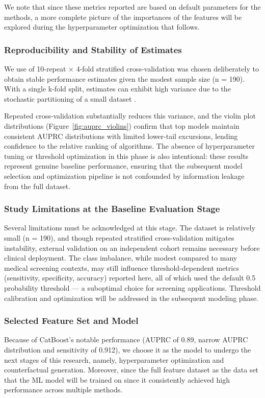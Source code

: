 \documentclass[pdflatex,sn-vancouver-num]{sn-jnl}
\begin{document}
We note that since these metrics reported are based on default parameters for the methods, a more complete picture of the importances of the features will be explored during the hyperparameter optimization that follows. 


\subsubsection{Reproducibility and Stability of Estimates}
We use of 10-repeat × 4-fold stratified cross-validation was chosen deliberately to obtain stable performance estimates given the modest sample size (n = 190). With a single k-fold split, estimates can exhibit high variance due to the stochastic partitioning of a small dataset \cite{kim2009estimating}. 

Repeated cross-validation substantially reduces this variance, and the violin plot distributions (Figure~\ref{fig:auprc_violins}) confirm that top models maintain consistent AUPRC distributions with limited lower-tail excursions, lending confidence to the relative ranking of algorithms. The absence of hyperparameter tuning or threshold optimization in this phase is also intentional: these results represent genuine baseline performance, ensuring that the subsequent model selection and optimization pipeline is not confounded by information leakage from the full dataset.

\subsubsection{Study Limitations at the Baseline Evaluation Stage}
Several limitations must be acknowledged at this stage. The dataset is relatively small (n = 190), and though repeated stratified cross-validation mitigates instability, external validation on an independent cohort remains necessary before clinical deployment. The class imbalance, while modest compared to many medical screening contexts, may still influence threshold-dependent metrics (sensitivity, specificity, accuracy) reported here, all of which used the default 0.5 probability threshold — a suboptimal choice for screening applications. Threshold calibration and optimization  will be addressed in the subsequent modeling phase. 

\subsubsection{Selected Feature Set and Model}
Because of CatBoost's notable performance (AUPRC of 0.89, narrow AUPRC distribution and sensitivity of 0.912), we choose it as the model to undergo the next stages of this research, namely, hyperparameter optimization and counterfactual generation. Moreover, since the full feature dataset as the data set that the ML model will be trained on since it consistently achieved high performance across multiple methods.
\end{document}
